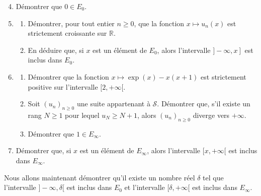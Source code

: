 \documentclass[landscape,twocolumn,leqno,a4paper,10pt]{report} %
\newcommand\n{\noindent}
\renewcommand{\geq}{\geqslant}
\begin{document}
\begin{enumerate}\setcounter{enumi}{3}
  	\item Démontrer que $0 \in E_{0}$.
  	\item \begin{enumerate}
  	\item Démontrer, pour tout entier $n \geq 0$, que la fonction $x \mapsto u_{n}(x)$ est strictement croissante sur $\mathbb{R}$.
  	\item En déduire que, si $x$ est un élément de $E_{0}$, alors l'intervalle $\left.]-\infty, x\right]$ est inclus dans $E_{0}$.
  	\end{enumerate}
  	\item \begin{enumerate}
  	\item Démontrer que la fonction $x \mapsto \exp (x)-x(x+1)$ est strictement positive sur l'intervalle $[2,+\infty[$.
  	\item Soit $\left(u_{n}\right)_{n \geq 0}$ une suite appartenant à $\mathscr{S}$. Démontrer que, s'il existe un rang $N \geq 1$ pour lequel $u_{N} \geq N+1$, alors $\left(u_{n}\right)_{n \geq 0}$ diverge vers $+\infty$.
  	\item Démontrer que $1 \in E_{\infty}$.
  	\end{enumerate}
	\item Démontrer que, si $x$ est un élément de $E_{\infty}$, alors l'intervalle $[x,+\infty[$ est inclus dans $E_{\infty}$.
\end{enumerate}

\n Nous allons maintenant démontrer qu'il existe un nombre réel $\delta$ tel que l'intervalle $] - \infty, \delta [$ est inclus dans $E_{0}$ et l'intervalle $[\delta,+\infty[$ est inclus dans $E_{\infty}$.
\end{document}
